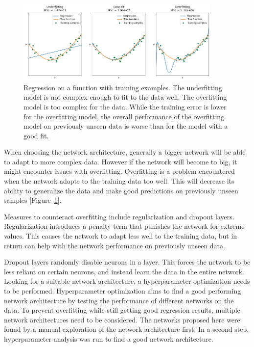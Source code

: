 \begin{figure} [H]
    \centering
    \includegraphics[width=0.9\textwidth]{figures/regression/overfitting.png} 
    \caption[Overfitting]{Regression on a function with training examples. 
            The underfitting model is not complex enough to fit to the data well. 
            The overfitting model is too complex for the data.
            While the training error is lower for the overfitting model, 
            the overall performance of the overfitting model on previously unseen data 
            is worse than for the model with a good fit.
        }
    \label{fig:overfitting}
\end{figure}
  
When choosing the network architecture, generally a bigger network will be able to adapt to more complex data.
However if the network will become to big, it might encounter issues with overfitting.
Overfitting is a problem encountered when the network adapts to the training data too well.
This will decrease its ability to generalize the data and make good predictions on previously unseen samples [Figure~\ref{fig:overfitting}].


Measures to counteract overfitting include regularization and dropout layers.
Regularization introduces a penalty term that punishes the network for extreme values.
This causes the network to adapt less well to the training data, but in return can help with the network
performance on previously unseen data.

Dropout layers randomly disable neurons in a layer.
This forces the network to be less reliant on certain neurons, and instead learn the data in the entire network.
\\

Looking for a suitable network architecture, a hyperparameter optimization needs to be performed.
Hyperparameter optimization aims to find a good performing network architecture by testing the performance
of different networks on the data.
To prevent overfitting while still getting good regression results, multiple network architectures need to be considered.
The networks proposed here were found by a manual exploration of the network architecture first.
In a second step, hyperparameter analysis was run to find a good network architecture.

